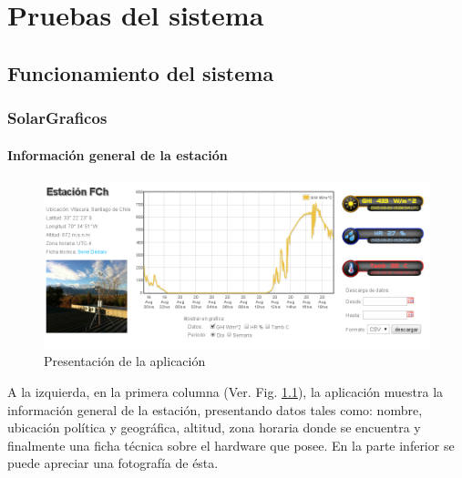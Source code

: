 \chapter{Pruebas del sistema}
\label{pruebas}

\section{Funcionamiento del sistema}
\subsection{SolarGraficos}
\subsubsection{Información general de la estación}
\begin{figure}[h]
	\centering
	\includegraphics[scale=0.42]{./images/cap5chap1img0}
	\caption{Presentación de la aplicación}
	\label{graficoPresentacion}
\end{figure}
A la izquierda, en la primera columna (Ver. Fig. \ref{graficoPresentacion}), la aplicación muestra la información general de la estación, presentando datos tales como: nombre, ubicación política y geográfica, altitud, zona horaria donde se encuentra y finalmente una ficha técnica sobre el hardware que posee. En la parte inferior se puede apreciar una fotografía de ésta.

